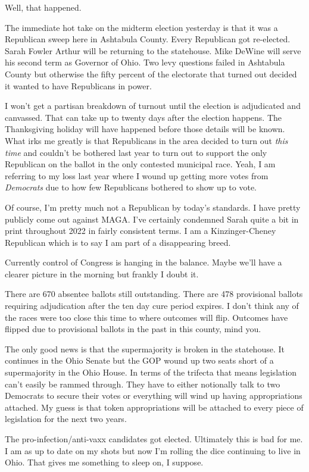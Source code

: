 Well, that happened.

The immediate hot take on the midterm election yesterday is that it was
a Republican sweep here in Ashtabula County. Every Republican got
re-elected. Sarah Fowler Arthur will be returning to the statehouse.
Mike DeWine will serve his second term as Governor of Ohio. Two levy
questions failed in Ashtabula County but otherwise the fifty percent of
the electorate that turned out decided it wanted to have Republicans in
power.

I won't get a partisan breakdown of turnout until the election is
adjudicated and canvassed. That can take up to twenty days after the
election happens. The Thanksgiving holiday will have happened before
those details will be known. What irks me greatly is that Republicans in
the area decided to turn out \emph{this time} and couldn't be bothered
last year to turn out to support the only Republican on the ballot in
the only contested municipal race. Yeah, I am referring to my loss last
year where I wound up getting more votes from \emph{Democrats} due to
how few Republicans bothered to show up to vote.

Of course, I'm pretty much not a Republican by today's standards. I have
pretty publicly come out against MAGA. I've certainly condemned Sarah
quite a bit in print throughout 2022 in fairly consistent terms. I am a
Kinzinger-Cheney Republican which is to say I am part of a disappearing
breed.

Currently control of Congress is hanging in the balance. Maybe we'll
have a clearer picture in the morning but frankly I doubt it.

There are 670 absentee ballots still outstanding. There are 478
provisional ballots requiring adjudication after the ten day cure period
expires. I don't think any of the races were too close this time to
where outcomes will flip. Outcomes have flipped due to provisional
ballots in the past in this county, mind you.

The only good news is that the supermajority is broken in the
statehouse. It continues in the Ohio Senate but the GOP wound up two
seats short of a supermajority in the Ohio House. In terms of the
trifecta that means legislation can't easily be rammed through. They
have to either notionally talk to two Democrats to secure their votes or
everything will wind up having appropriations attached. My guess is that
token appropriations will be attached to every piece of legislation for
the next two years.

The pro-infection/anti-vaxx candidates got elected. Ultimately this is
bad for me. I am as up to date on my shots but now I'm rolling the dice
continuing to live in Ohio. That gives me something to sleep on, I
suppose.
